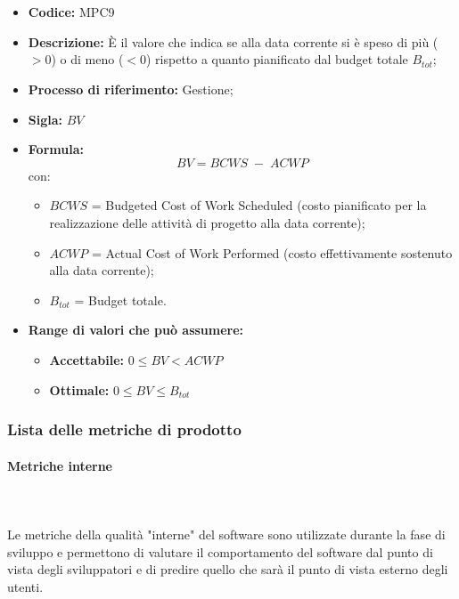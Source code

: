     \mbox{}\\ \\
        \begin{itemize}
            \item \textbf{Codice:} MPC9
            \item \textbf{Descrizione:} È il valore che indica se alla data corrente si è speso di più ($>0$) o di meno ($<0$) rispetto a quanto pianificato dal budget totale $B_{tot}$;
            \item \textbf{Processo di riferimento:} Gestione;
            \item \textbf{Sigla:} $BV$
            \item \textbf{Formula:} $$BV = {BCWS \; - \; ACWP}$$
            con:
            \begin{itemize}
                \item $BCWS$ = Budgeted Cost of Work Scheduled (costo pianificato per la realizzazione delle attività di progetto alla data corrente);
                \item $ACWP$ = Actual Cost of Work Performed (costo effettivamente sostenuto alla data corrente);
                \item $B_{tot}$ = Budget totale.
            \end{itemize}
            \item \textbf{Range di valori che può assumere:}
            \begin{itemize}
                \item \textbf{Accettabile:} $0 \leq BV < ACWP$
                \item \textbf{Ottimale:} $0 \leq BV \leq B_{tot}$
            \end{itemize}
        \end{itemize}
\newpage
\subsubsection{Lista delle metriche di prodotto}
\paragraph{Metriche interne}\mbox{}\\ \\
Le metriche della qualità "interne" del software sono utilizzate durante la fase di sviluppo e permettono di valutare il comportamento del software dal punto di vista degli sviluppatori e di predire quello che sarà il punto di vista esterno degli utenti.

